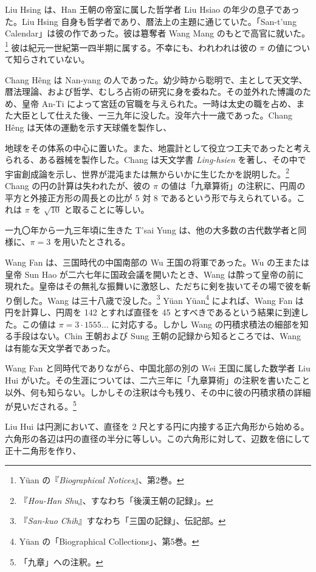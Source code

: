 \documentclass[11pt]{article}
\newcommand{\scanpage}[2]{\clearpage\setcounter{footnote}{0}\noindent{\footnotesize\color{gray}PDF #1 頁 · #2}\par\medskip}
\newcommand{\scanfooter}{}
\begin{document}
Liu Hsing は、Han 王朝の帝室に属した哲学者 Liu Hsiao の年少の息子であった。Liu Hsing 自身も哲学者であり、暦法上の主題に通じていた。「San-t'ung Calendar」は彼の作であった。彼は簒奪者 Wang Mang のもとで高官に就いた。\footnote{Yüan の『\emph{Biographical Notices}』、第2巻。} 彼は紀元一世紀第一四半期に属する。不幸にも、われわれは彼の $\pi$ の値について知らされていない。

Chang Hêng は Nan-yang の人であった。幼少時から聡明で、主として天文学、暦法理論、および哲学、むしろ占術の研究に身を委ねた。その並外れた博識のため、皇帝 An-Ti によって宮廷の官職を与えられた。一時は太史の職を占め、また大臣として仕えた後、一三九年に没した。没年六十一歳であった。Chang Hêng は天体の運動を示す天球儀を製作し、
\scanfooter

\scanpage{0061}{第7章、印刷頁47}
\setcounter{footnote}{0}
地球をその体系の中心に置いた。また、地震計として役立つ工夫であったと考えられる、ある器械を製作した。Chang は天文学書 \emph{Ling-hsien} を著し、その中で宇宙創成論を示し、世界が混沌または無からいかに生じたかを説明した。\footnote{『\emph{Hou-Han Shu}』、すなわち「後漢王朝の記録」。} Chang の円の計算は失われたが、彼の $\pi$ の値は「九章算術」の注釈に、円周の平方と外接正方形の周長との比が 5 対 8 であるという形で与えられている。これは $\pi$ を $\sqrt{10}$ と取ることに等しい。

一九〇年から一九三年頃に生きた T'sai Yung は、他の大多数の古代数学者と同様に、$\pi=3$ を用いたとされる。

Wang Fan は、三国時代の中国南部の Wu 王国の将軍であった。Wu の王または皇帝 Sun Hao が二六七年に国政会議を開いたとき、Wang は酔って皇帝の前に現れた。皇帝はその無礼な振舞いに激怒し、ただちに剣を抜いてその場で彼を斬り倒した。Wang は三十八歳で没した。\footnote{『\emph{San-kuo Chih}』すなわち「三国の記録」、伝記部。} Yüan Yüan\footnote{Yüan の「Biographical Collections」、第5巻。} によれば、Wang Fan は円を計算し、円周を 142 とすれば直径を 45 とすべきであるという結果に到達した。この値は $\pi=3\cdot1555\ldots$ に対応する。しかし Wang の円積求積法の細部を知る手段はない。Chin 王朝および Sung 王朝の記録から知るところでは、Wang は有能な天文学者であった。

Wang Fan と同時代でありながら、中国北部の別の Wei 王国に属した数学者 Liu Hui がいた。その生涯については、二六三年に「九章算術」の注釈を書いたこと以外、何も知らない。しかしその注釈は今も残り、その中に彼の円積求積の詳細が見いだされる。\footnote{「九章」への注釈。}

Liu Hui は円測において、直径を 2 尺とする円に内接する正六角形から始める。六角形の各辺は円の直径の半分に等しい。この六角形に対して、辺数を倍にして正十二角形を作り、
\scanfooter
\end{document}
